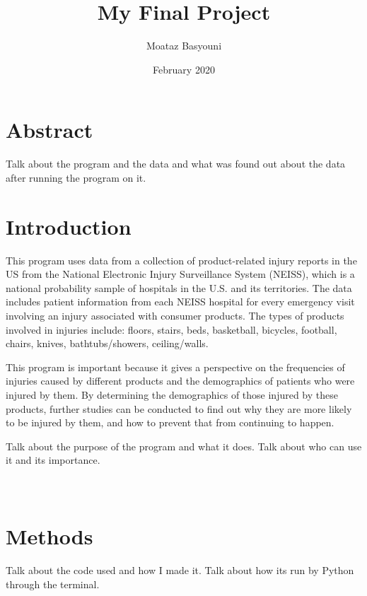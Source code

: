 \documentclass{article}
\title{My Final Project}
\author{Moataz Basyouni}
\date {February 2020}
\begin{document}
\maketitle

\section{Abstract}
Talk about the program and the data and what was found out about the data after running the program on it.
\newpage

\tableofcontents
\listoffigures
\newpage

\section{Introduction}
This program uses data from a collection of product-related injury reports in the US from the National Electronic Injury Surveillance System (NEISS), which is a national probability sample of hospitals in the U.S. and its territories. The data includes patient information from each NEISS hospital for every emergency visit involving an injury associated with consumer products. The types of products involved in injuries include: floors, stairs, beds, basketball, bicycles, football, chairs, knives, bathtubs/showers, ceiling/walls.

This program is important because it gives a perspective on the frequencies of injuries caused by different products and the demographics of patients who were injured by them. By determining the demographics of those injured by these products, further studies can be conducted to find out why they are more likely to be injured by them, and how to prevent that from continuing to happen.

Talk about the purpose of the program and what it does. Talk about who can use it and its importance.\\\\\\


\section{Methods}
Talk about the code used and how I made it. Talk about how its run by Python through the terminal.\\
\end{document}
